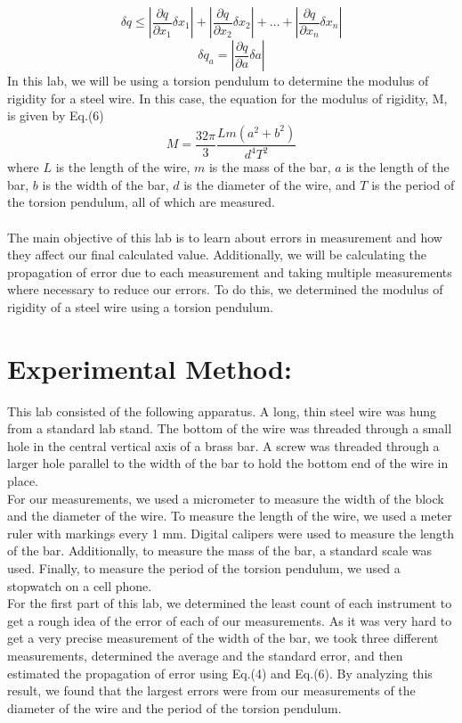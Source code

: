 \documentclass[leqno]{article}
\begin{document}
\begin{equation}
	\delta q \leq |\frac{\partial q}{\partial x_1}\delta x_1|+|\frac{\partial q}{\partial x_2}\delta x_2|+\ldots + |\frac{\partial q}{\partial x_n}\delta x_n|
\end{equation}
\begin{equation}
	\delta q_a=|\frac{\partial q}{\partial a}\delta a|
\end{equation}
In this lab, we will be using a torsion pendulum to determine the modulus of rigidity for a steel wire.
In this case, the equation for the modulus of rigidity, M, is given by Eq.(6)
\begin{equation}
	M=\frac{32\pi}{3}\frac{Lm(a^2+b^2)}{d^4T^2}
\end{equation}
where $L$ is the length of the wire, $m$ is the mass of the bar, $a$ is the length of the bar, $b$ is the width of the bar, $d$ is the diameter of the wire, and $T$ is the period of the torsion pendulum, all of which are measured.\\\\
The main objective of this lab is to learn about errors in measurement and how they affect our final calculated value.  Additionally, we will be calculating the propagation of error due to each measurement and taking multiple measurements where necessary to reduce our errors.  To do this, we determined the modulus of rigidity of a steel wire using a torsion pendulum.
\section*{Experimental Method:}
This lab consisted of the following apparatus.  A long, thin steel wire was hung from a standard lab stand.  The bottom of the wire was threaded through a small hole in the central vertical axis of a brass bar.  A screw was threaded through a larger hole parallel to the width of the bar to hold the bottom end of the wire in place.\\

\noindent For our measurements, we used a micrometer to measure the width of the block and the diameter of the wire.  To measure the length of the wire, we used a meter ruler with markings every 1 mm.  Digital calipers were used to measure the length of the bar.  Additionally, to measure the mass of the bar, a standard scale was used.  Finally, to measure the period of the torsion pendulum, we used a stopwatch on a cell phone.\\

\noindent For the first part of this lab, we determined the least count of each instrument to get a rough idea of the error of each of our measurements.  As it was very hard to get a very precise measurement of the width of the bar, we took three different measurements, determined the average and the standard error, and then estimated the propagation of error using Eq.(4) and Eq.(6).  By analyzing this result, we found that the largest errors were from our measurements of the diameter of the wire and the period of the torsion pendulum.\\
\end{document}
